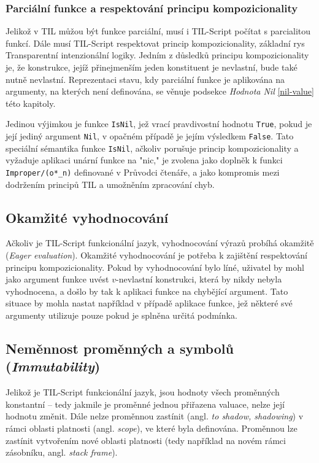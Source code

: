 \subsubsection{Parciální funkce a respektování principu kompozicionality}

Jelikož v TIL můžou být funkce parciální, musí i TIL-Script počítat s parcialitou funkcí. Dále musí
TIL-Script respektovat princip kompozicionality, základní rys Transparentní intenzionální logiky.
Jedním z důsledků principu kompozicionality je, že konstrukce, jejíž přinejmenším jeden konstituent
je nevlastní, bude také nutně nevlastní. Reprezentaci stavu, kdy parciální funkce je aplikována
na argumenty, na kterých není definována, se věnuje podsekce \textit{Hodnota Nil} \ref{nil-value}
této kapitoly. 

Jedinou výjimkou je funkce \lstinline{IsNil}, jež vrací pravdivostní hodnotu \lstinline{True},
pokud je její jediný argument \lstinline{Nil}, v opačném případě je jejím výsledkem
\lstinline{False}. Tato speciální sémantika funkce \lstinline{IsNil}, ačkoliv porušuje princip
kompozicionality a vyžaduje aplikaci unární funkce na "nic," je zvolena jako doplněk k funkci
\lstinline{Improper/(o*_n)} definované v Průvodci čtenáře, a jako kompromis mezi dodržením
principů TIL a umožněním zpracování chyb.

\subsection{Okamžité vyhodnocování}

Ačkoliv je TIL-Script funkcionální jazyk, vyhodnocování výrazů probíhá okamžitě
(\textit{Eager evaluation}). Okamžité vyhodnocování je potřeba k zajištění respektování principu
kompozicionality. Pokud by vyhodnocování bylo líné, uživatel by mohl jako argument funkce uvést
$v$-nevlastní konstrukci, která by nikdy nebyla vyhodnocena, a došlo by tak k aplikaci funkce
na chybějící argument. Tato situace by mohla nastat například v případě aplikace funkce, jež 
některé své argumenty utilizuje pouze pokud je splněna určitá podmínka.

\subsection{Neměnnost proměnných a symbolů (\textit{Immutability})}

Jelikož je TIL-Script funkcionální jazyk, jsou hodnoty všech proměnných konstantní -- tedy
jakmile je proměnné jednou přiřazena valuace, nelze její hodnotu změnit. Dále nelze proměnnou
zastínit (angl. \textit{to shadow, shadowing}) v rámci oblasti platnosti (angl. \textit{scope}),
ve které byla definována. Proměnnou lze zastínit vytvořením nové oblasti platnosti (tedy například
na novém rámci zásobníku, angl. \textit{stack frame}).

